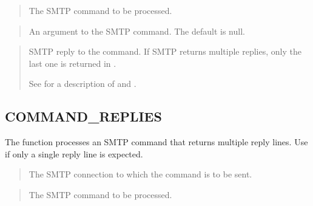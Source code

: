 \documentclass[letterpaper,10pt,english,openany,oneside]{sphinxmanual}
\begin{document}
\begin{quote}

The SMTP command to be processed.
\end{quote}

\newpage

\begin{quote}

An argument to the SMTP command. The default is null.
\end{quote}

\begin{quote}

SMTP reply to the command. If SMTP returns multiple replies, only the
last one is returned in .

See {\hyperref[\detokenize{utl_smtp:reply-replies}]{}} for a description of  and .
\end{quote}


\subsection{COMMAND\_REPLIES}
\label{\detokenize{utl_smtp:command-replies}}
The  function processes an SMTP command that returns
multiple reply lines. Use  if only a single reply line is
expected.
\begin{quote}


\end{quote}


\begin{quote}

The SMTP connection to which the command is to be sent.
\end{quote}

\begin{quote}

The SMTP command to be processed.
\end{quote}
\end{document}
